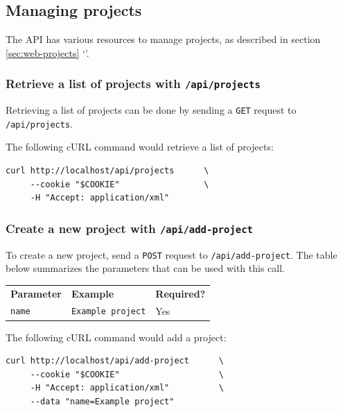 \subsection{Managing projects}

  The API has various resources to manage projects, as described in
  section \ref{sec:web-projects} {\color{LinkGray}`'}.

\subsubsection{Retrieve a list of projects with \texttt{/api/projects}}

  Retrieving a list of projects can be done by sending a \texttt{GET} request
  to \texttt{/api/projects}.

  The following cURL command would retrieve a list of projects:

\begin{siderules}
\begin{verbatim}
curl http://localhost/api/projects      \
     --cookie "$COOKIE"                 \
     -H "Accept: application/xml"
\end{verbatim}
\end{siderules}

\subsubsection{Create a new project with \texttt{/api/add-project}}
\label{sec:api-add-project}

  To create a new project, send a \texttt{POST} request to
  \texttt{/api/add-project}.  The table below summarizes the parameters
  that can be used with this call.

  \hypersetup{urlcolor=black}
  \begin{table}[H]
    \begin{tabularx}{\textwidth}{l!{\VRule[-1pt]}X!{\VRule[-1pt]}X}
      \headrow
      \textbf{Parameter} & \textbf{Example} & \textbf{Required?}\\
      \evenrow
      \texttt{name}      & \texttt{Example project} & Yes\\
    \end{tabularx}
  \end{table}
  \hypersetup{urlcolor=LinkGray}

  The following cURL command would add a project:

\begin{siderules}
\begin{verbatim}
curl http://localhost/api/add-project      \
     --cookie "$COOKIE"                    \
     -H "Accept: application/xml"          \
     --data "name=Example project"
\end{verbatim}
\end{siderules}

